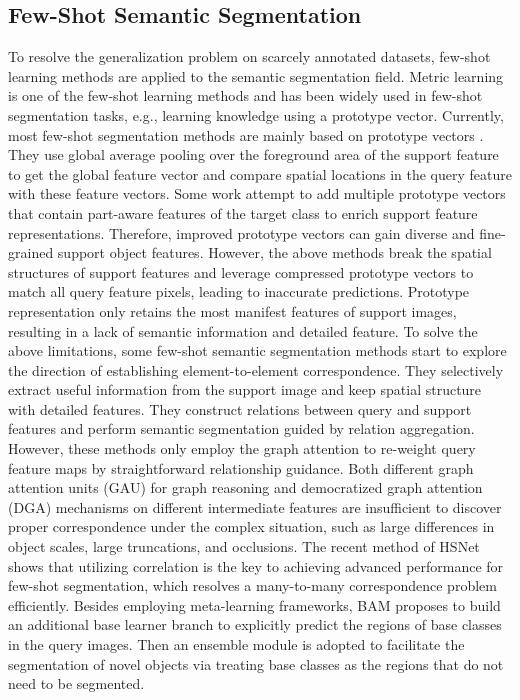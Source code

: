 \documentclass[journal]{IEEEtran}
\begin{document}
\subsection{Few-Shot Semantic Segmentation}
To resolve the generalization problem on scarcely annotated datasets, few-shot learning \cite{snell2017prototypical, vinyals2016matching, sung2018learning, finn2017model} methods are applied to the semantic segmentation field. Metric learning is one of the few-shot learning methods and has been widely used in few-shot segmentation tasks, e.g., learning knowledge using a prototype vector. Currently, most few-shot segmentation methods are mainly based on prototype vectors \cite{zhang2019canet, yang2020prototype, liu2021anti, zhang2020sg}. They use global average pooling over the foreground area of the support feature to get the global feature vector and compare spatial locations in the query feature with these feature vectors. Some work \cite{liu2020part, yang2020prototype, liu2021anti} attempt to add multiple prototype vectors that contain part-aware features of the target class to enrich support feature representations. Therefore, improved prototype vectors can gain diverse and fine-grained support object features. However, the above methods break the spatial structures of support features and leverage compressed prototype vectors to match all query feature pixels, leading to inaccurate predictions. Prototype representation only retains the most manifest features of support images, resulting in a lack of semantic information and detailed feature. To solve the above limitations, some few-shot semantic segmentation methods \cite{wang2020few, zhang2019pyramid} start to explore the direction of establishing element-to-element correspondence. They selectively extract useful information from the support image and keep spatial structure with detailed features. They construct relations between query and support features and perform semantic segmentation guided by relation aggregation. However, these methods only employ the graph attention to re-weight query feature maps by straightforward relationship guidance. Both different graph attention units (GAU) \cite{zhang2019pyramid} for graph reasoning and democratized graph attention (DGA) \cite{wang2020few} mechanisms on different intermediate features are insufficient to discover proper correspondence under the complex situation, such as large differences in object scales, large truncations, and occlusions. The recent method of HSNet \cite{min2021hypercorrelation} shows that utilizing correlation is the key to achieving advanced performance for few-shot segmentation, which resolves a many-to-many correspondence problem efficiently. Besides employing meta-learning frameworks, BAM \cite{lang2022learning} proposes to build an additional base learner branch to explicitly predict the regions of base classes in the query images. Then an ensemble module is adopted to facilitate the segmentation of novel objects via treating base classes as the regions that do not need to be segmented.
\end{document}
